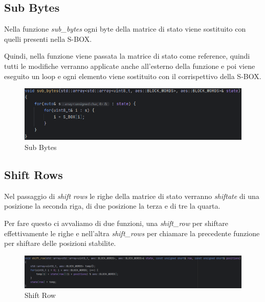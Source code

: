 \subsection{Sub Bytes}

\textsf{\small Nella funzione \emph{sub\_bytes} ogni byte della matrice di stato viene sostituito con quelli presenti nella S-BOX.}

\textsf{\small Quindi, nella funzione viene passata la matrice di stato come reference, quindi tutti le modifiche verranno applicate anche all'esterno della funzione e poi viene eseguito un loop e ogni elemento viene sostituito con il corrispettivo della S-BOX.}

\begin{figure}[H]
	\centering
	\includegraphics[width=1\textwidth, height=1\textheight, keepaspectratio]{./images/code/cpp/encryption/sub_bytes.PNG}
	\caption{Sub Bytes}
	\label{fig:sub_bytes}
\end{figure}

\subsection{Shift Rows}

\textsf{\small Nel passaggio di \emph{shift rows} le righe della matrice di stato verranno \emph{shiftate} di una posizione la seconda riga, di due posizione la terza e di tre la quarta.}

\textsf{\small Per fare questo ci avvaliamo di due funzioni, una \emph{shift\_row} per shiftare effettivamente le righe e nell'altra \emph{shift\_rows} per chiamare la precedente funzione per shiftare delle posizioni stabilite.}


\begin{figure}[H]
	\centering
	\includegraphics[width=1\textwidth, height=1\textheight, keepaspectratio]{./images/code/cpp/encryption/shift_row.PNG}
	\caption{Shift Row}
	\label{fig:shift_row}
\end{figure}

